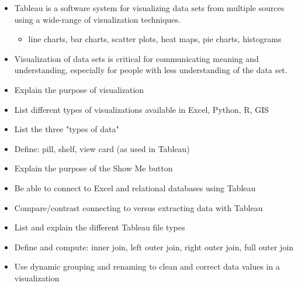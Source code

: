 \documentclass[xcolor=svgnames]{beamer} %
\begin{document}
\begin{frame}
\begin{itemize}
\item Tableau is a software system for visualizing data sets from multiple sources using a wide-range of visualization techniques.
\begin{itemize}
\item line charts, bar charts, scatter plots, heat maps, pie charts, histograms

\end{itemize}



\item Visualization of data sets is critical for communicating meaning and understanding, especially for people with less understanding of the data set.
\end{itemize}
\end{frame}

\begin{frame}
\begin{itemize}
\item Explain the purpose of visualization
\item List different types of visualizations available in Excel, Python, R, GIS
\item List the three "types of data"
\item Define: pill, shelf, view card (as used in Tableau)
\item Explain the purpose of the Show Me button
\item Be able to connect to Excel and relational databases using Tableau
\item Compare/contrast connecting to versus extracting data with Tableau
\item List and explain the different Tableau file types
\item Define and compute: inner join, left outer join, right outer join, full outer join
\item Use dynamic grouping and renaming to clean and correct data values in a visualization

\end{itemize}
\end{frame}
\end{document}
